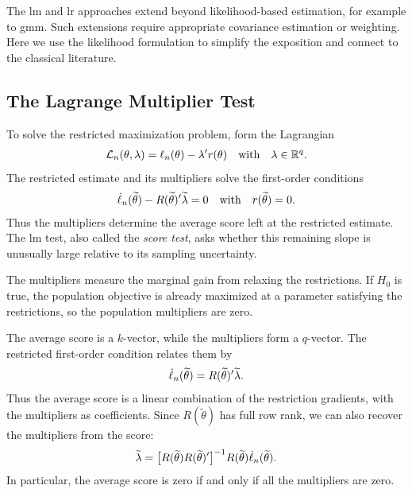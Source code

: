 \documentclass[a4paper,12pt]{article}
\begin{document}
\begin{remark}
	The \gls{lm} and \gls{lr} approaches extend beyond likelihood-based estimation, for example to \gls{gmm}.
	Such extensions require appropriate covariance estimation or weighting.
	Here we use the likelihood formulation to simplify the exposition and connect to the classical literature.
\end{remark}

\subsection{The Lagrange Multiplier Test}

To solve the restricted maximization problem, form the Lagrangian
\begin{align}
	\mathcal L_n(\theta,\lambda)=\ell_n(\theta)-\lambda^{\prime} r(\theta)
	\quad\text{with}\quad
	\lambda\in\mathbb{R}^q.
\end{align}
The restricted estimate and its multipliers solve the first-order conditions
\begin{align}\label{eq-lm-foc}
	\dot\ell_n(\widetilde\theta)-R(\widetilde\theta)^{\prime}\widetilde\lambda=0
	\quad\text{with}\quad
	r(\widetilde\theta)=0.
\end{align}
Thus the multipliers determine the average score left at the restricted estimate.
The \gls{lm} test, also called the \emph{score test}, asks whether this remaining slope is unusually large relative to its sampling uncertainty.

\begin{remark}[Interpretation]
	The multipliers measure the marginal gain from relaxing the restrictions.
	If $H_0$ is true, the population objective is already maximized at a parameter satisfying the restrictions,
	so the population multipliers are zero.
\end{remark}

\begin{remark}
	The average score is a $k$-vector, while the multipliers form a $q$-vector.
	The restricted first-order condition relates them by
	\begin{align*}
		\dot\ell_n(\widetilde\theta)=R(\widetilde\theta)^{\prime}\widetilde\lambda.
	\end{align*}
	Thus the average score is a linear combination of the restriction gradients, with the multipliers as coefficients.
	Since $R(\widetilde\theta)$ has full row rank, we can also recover the multipliers from the score:
	\begin{align*}
		\widetilde\lambda
		=\big[R(\widetilde\theta)R(\widetilde\theta)^{\prime}\big]^{-1}
		R(\widetilde\theta)\dot\ell_n(\widetilde\theta).
	\end{align*}
	In particular, the average score is zero if and only if all the multipliers are zero.
\end{remark}
\end{document}
